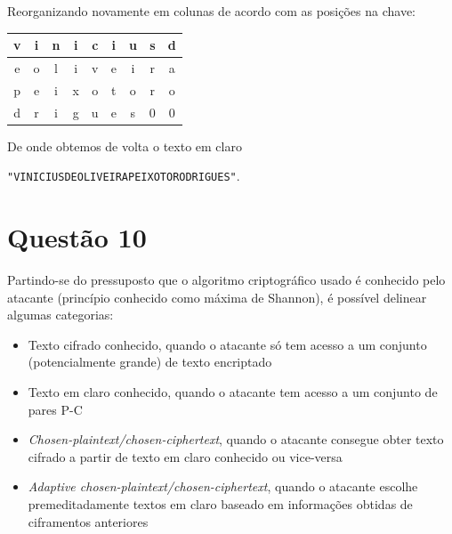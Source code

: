 \documentclass{article}
\begin{document}
    Reorganizando novamente em colunas de acordo com as posições na chave:

    \begin{center}
    \begin{tabular}{|c|c|c|c|c|c|c|c|c|}
       \hline
       v & i & n & i & c & i & u & s & d \\ \hline
       e & o & l & i & v & e & i & r & a \\ \hline
       p & e & i & x & o & t & o & r & o \\ \hline
       d & r & i & g & u & e & s & 0 & 0 \\ \hline
    \end{tabular}
    \end{center}

    De onde obtemos de volta o texto em claro
    
    \texttt{"VINICIUSDEOLIVEIRAPEIXOTORODRIGUES"}.

    \section*{Questão 10}

    Partindo-se do pressuposto que o algoritmo criptográfico usado é conhecido pelo atacante (princípio conhecido como máxima de Shannon), é possível delinear algumas categorias:

    \begin{itemize}
        \item Texto cifrado conhecido, quando o atacante só tem acesso a um conjunto (potencialmente grande) de texto encriptado
        \item Texto em claro conhecido, quando o atacante tem acesso a um conjunto de pares P-C
        \item \textit{Chosen-plaintext/chosen-ciphertext}, quando o atacante consegue obter texto cifrado a partir de texto em claro conhecido ou vice-versa
        \item \textit{Adaptive chosen-plaintext/chosen-ciphertext}, quando o atacante escolhe premeditadamente textos em claro baseado em informações obtidas de ciframentos anteriores
    \end{itemize}
\end{document}
